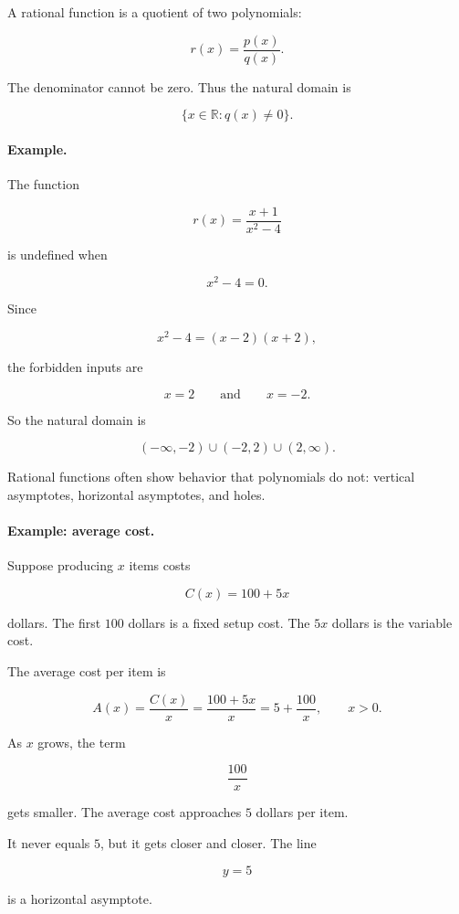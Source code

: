 A rational function is a quotient of two polynomials:

\[
r(x)=\frac{p(x)}{q(x)}.
\]

The denominator cannot be zero. Thus the natural domain is

\[
\{x\in\mathbb R:q(x)\neq 0\}.
\]

\paragraph{Example.}
The function

\[
r(x)=\frac{x+1}{x^2-4}
\]

is undefined when

\[
x^2-4=0.
\]

Since

\[
x^2-4=(x-2)(x+2),
\]

the forbidden inputs are

\[
x=2
\qquad\text{and}\qquad
x=-2.
\]

So the natural domain is

\[
(-\infty,-2)\cup(-2,2)\cup(2,\infty).
\]

Rational functions often show behavior that polynomials do not: vertical asymptotes, horizontal asymptotes, and holes.

\paragraph{Example: average cost.}
Suppose producing \(x\) items costs

\[
C(x)=100+5x
\]

dollars. The first \(100\) dollars is a fixed setup cost. The \(5x\) dollars is the variable cost.

The average cost per item is

\[
A(x)=\frac{C(x)}{x}
=
\frac{100+5x}{x}
=
5+\frac{100}{x},
\qquad x>0.
\]

As \(x\) grows, the term

\[
\frac{100}{x}
\]

gets smaller. The average cost approaches \(5\) dollars per item.

It never equals \(5\), but it gets closer and closer. The line

\[
y=5
\]

is a horizontal asymptote.

